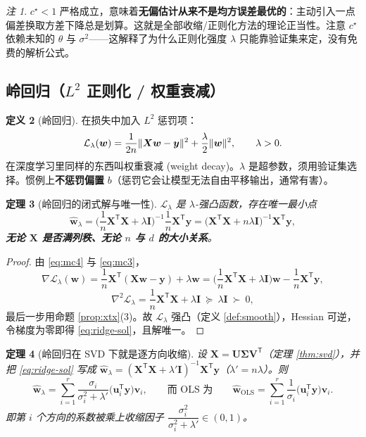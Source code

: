 \documentclass[UTF8,a4paper,11pt]{ctexart}
\theoremstyle{definition}
\newtheorem{definition}{定义}[section]
\theoremstyle{plain}
\newtheorem{theorem}[definition]{定理}
\theoremstyle{remark}
\newtheorem{remark}[definition]{注}
\DeclarePairedDelimiter{\norm}{\lVert}{\rVert}
\newcommand{\Loss}{\mathcal{L}}
\newcommand{\T}{^{\mathsf{T}}}
\newcommand{\eng}[1]{\textup{(#1)}}
\begin{document}
\begin{remark}
$c^\star<1$ 严格成立，意味着\textbf{无偏估计从来不是均方误差最优的}：主动引入一点偏差换取方差下降总是划算。这就是全部收缩/正则化方法的理论正当性。注意 $c^\star$ 依赖未知的 $\theta$ 与 $\sigma^2$——这解释了为什么正则化强度 $\lambda$ 只能靠验证集来定，没有免费的解析公式。
\end{remark}

\subsection{岭回归（$L^2$ 正则化 / 权重衰减）}

\begin{definition}[岭回归]\label{def:ridge}
在损失中加入 $L^2$ 惩罚项：
\begin{equation}\label{eq:ridge-obj}
  \Loss_{\lambda}(\bm{w})=\frac{1}{2n}\norm{\bm{X}\bm{w}-\bm{y}}^2+\frac{\lambda}{2}\norm{\bm{w}}^2,
  \qquad\lambda>0 .
\end{equation}
在深度学习里同样的东西叫权重衰减 \eng{weight decay}。$\lambda$ 是超参数，须用验证集选择。惯例上\textbf{不惩罚偏置} $b$（惩罚它会让模型无法自由平移输出，通常有害）。
\end{definition}

\begin{theorem}[岭回归的闭式解与唯一性]\label{thm:ridge}
$\Loss_\lambda$ 是 $\lambda$-强凸函数，存在唯一最小点
\begin{equation}\label{eq:ridge-sol}
  \hat{\bm{w}}_{\lambda}=\Big(\frac1n\bm{X}\T\bm{X}+\lambda\bm{I}\Big)^{-1}\frac1n\bm{X}\T\bm{y}
  =\big(\bm{X}\T\bm{X}+n\lambda\bm{I}\big)^{-1}\bm{X}\T\bm{y},
\end{equation}
\textbf{无论 $\bm{X}$ 是否满列秩、无论 $n$ 与 $d$ 的大小关系}。
\end{theorem}

\begin{proof}
由 \eqref{eq:mc4} 与 \eqref{eq:mc3}，
\[
  \nabla\Loss_\lambda(\bm{w})=\frac1n\bm{X}\T(\bm{X}\bm{w}-\bm{y})+\lambda\bm{w}
  =\Big(\frac1n\bm{X}\T\bm{X}+\lambda\bm{I}\Big)\bm{w}-\frac1n\bm{X}\T\bm{y},
\]
\[
  \nabla^2\Loss_\lambda=\frac1n\bm{X}\T\bm{X}+\lambda\bm{I}\ \succeq\ \lambda\bm{I}\ \succ\ 0,
\]
最后一步用命题 \ref{prop:xtx}(3)。故 $\Loss_\lambda$ 强凸（定义 \ref{def:smooth}），Hessian 可逆，令梯度为零即得 \eqref{eq:ridge-sol}，且解唯一。
\end{proof}

\begin{theorem}[岭回归在 SVD 下就是逐方向收缩]\label{thm:ridge-svd}
设 $\bm{X}=\bm{U}\bm{\Sigma}\bm{V}\T$（定理 \ref{thm:svd}），并把 \eqref{eq:ridge-sol} 写成 $\hat{\bm{w}}_\lambda=(\bm{X}\T\bm{X}+\lambda'\bm{I})^{-1}\bm{X}\T\bm{y}$（$\lambda'=n\lambda$）。则
\begin{equation}\label{eq:ridge-shrink}
  \hat{\bm{w}}_{\lambda}=\sum_{i=1}^{r}\frac{\sigma_i}{\sigma_i^2+\lambda'}\big(\bm{u}_i\T\bm{y}\big)\bm{v}_i ,
  \qquad\text{而 OLS 为}\qquad
  \hat{\bm{w}}_{\text{OLS}}=\sum_{i=1}^{r}\frac{1}{\sigma_i}\big(\bm{u}_i\T\bm{y}\big)\bm{v}_i .
\end{equation}
即第 $i$ 个方向的系数被乘上收缩因子 $\dfrac{\sigma_i^2}{\sigma_i^2+\lambda'}\in(0,1)$。
\end{theorem}
\end{document}

